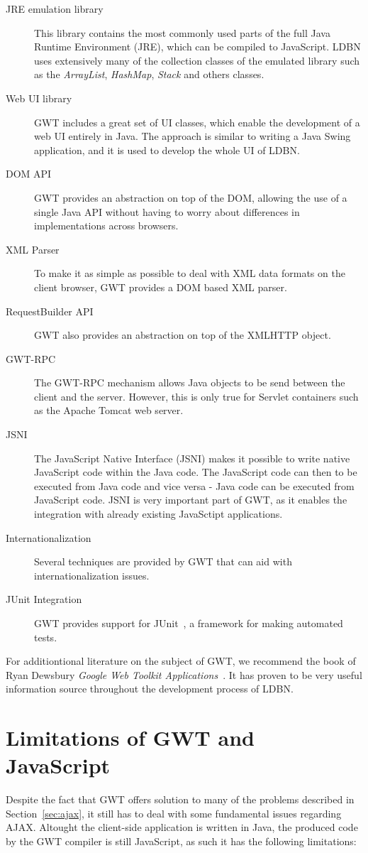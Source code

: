 \begin{description}
	\item[JRE emulation library] This library contains 
	the most commonly used parts of the full Java Runtime Environment (JRE), 
	which can be compiled to JavaScript. LDBN uses extensively many of the collection 
	classes of the emulated library such as the \textit{ArrayList}, \textit{HashMap}, 
	\textit{Stack} and others classes.
	\item[Web UI library] GWT includes a great set of UI classes, which 
	enable the development of a web UI entirely in Java. The approach is similar 
	to writing a Java Swing application, and it is used to develop the whole UI 
	of LDBN. 
	\item[DOM API] GWT provides an abstraction on top of the DOM, 
	allowing the use of a single Java API without having to worry about 
	differences in implementations across browsers.
	\item[XML Parser] To make it as simple as possible to deal with XML data formats 
	on the client browser, GWT provides a DOM based XML parser.
	\item[RequestBuilder API] GWT also provides an abstraction on top of the
	XMLHTTP object. 
	\item[GWT-RPC] The GWT-RPC mechanism allows Java objects to be send between 
	the client and the server. However, this is only true for 
	Servlet containers such as the Apache Tomcat web server. 
	\item[JSNI] The JavaScript Native Interface (JSNI) makes it possible to
	write native JavaScript code within the Java code. The JavaScript code can 
	then to be executed from Java code and vice versa - Java code can be executed
	from JavaScript code. JSNI is very important part of GWT, as it enables 
	the integration with already existing JavaSctipt applications.  
	\item[Internationalization] Several techniques are provided by GWT that can 
	aid with internationalization issues.
	\item[JUnit Integration] GWT provides support for JUnit~\cite{wjunit}, 
	a framework for making automated tests.
\end{description}

For additiontional literature on the subject of GWT, we recommend the book of 
Ryan Dewsbury \textit{Google Web Toolkit Applications}~\cite{bgwt2}. It has
proven to be very useful information source throughout the development process 
of LDBN.  

\section{Limitations of GWT and JavaScript}
Despite the fact that GWT offers solution to many of the problems
described in Section~\ref{sec:ajax}, it still has to deal with some 
fundamental issues regarding 
AJAX. Altought the client-side application is written in Java, 
the produced code by the GWT compiler is still JavaScript, 
as such it has the following limitations:
   
